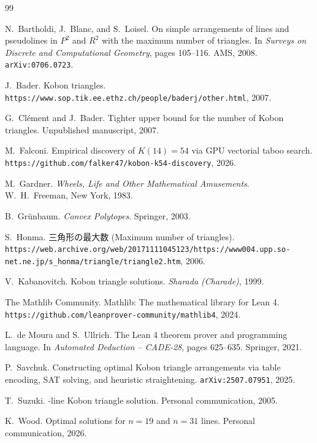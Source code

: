 \documentclass[11pt,a4paper]{article}
\theoremstyle{plain}
\theoremstyle{definition}
\theoremstyle{remark}
\newcommand{\K}{K}
\begin{document}
\begin{thebibliography}{99}

N.\ Bartholdi, J.\ Blanc, and S.\ Loisel.
\newblock On simple arrangements of lines and pseudolines in $P^2$ and $R^2$ with the maximum number of triangles.
\newblock In \textit{Surveys on Discrete and Computational Geometry}, pages 105--116.
\newblock AMS, 2008.
\newblock \texttt{arXiv:0706.0723}.

J.\ Bader.
\newblock Kobon triangles.
\newblock \texttt{https://www.sop.tik.ee.ethz.ch/people/baderj/other.html}, 2007.

G.\ Clément and J.\ Bader.
\newblock Tighter upper bound for the number of Kobon triangles.
\newblock Unpublished manuscript, 2007.

M.\ Falconi.
\newblock Empirical discovery of $\K(14)=54$ via GPU vectorial taboo search.
\newblock \texttt{https://github.com/falker47/kobon-k54-discovery}, 2026.

M.\ Gardner.
\newblock \textit{Wheels, Life and Other Mathematical Amusements}.
\newblock W.\ H.\ Freeman, New York, 1983.

B.\ Gr\"unbaum.
\newblock \textit{Convex Polytopes}.
\newblock Springer, 2003.

S.\ Honma.
\newblock 三角形の最大数 (Maximum number of triangles).
\newblock \texttt{https://web.archive.org/web/20171111045123/https://www004.upp.so-net.ne.jp/s\_honma/triangle/triangle2.htm}, 2006.

V.\ Kabanovitch.
\newblock Kobon triangle solutions.
\newblock \textit{Sharada (Charade)}, 1999.

The Mathlib Community.
\newblock Mathlib: The mathematical library for Lean 4.
\newblock \texttt{https://github.com/leanprover-community/mathlib4}, 2024.

L.\ de Moura and S.\ Ullrich.
\newblock The Lean 4 theorem prover and programming language.
\newblock In \textit{Automated Deduction -- CADE-28}, pages 625--635.
\newblock Springer, 2021.

P.\ Savchuk.
\newblock Constructing optimal Kobon triangle arrangements via table encoding, SAT solving, and heuristic straightening.
\newblock \texttt{arXiv:2507.07951}, 2025.

T.\ Suzuki.
-line Kobon triangle solution.
\newblock Personal communication, 2005.

K.\ Wood.
\newblock Optimal solutions for $n=19$ and $n=31$ lines.
\newblock Personal communication, 2026.

\end{thebibliography}
\end{document}
